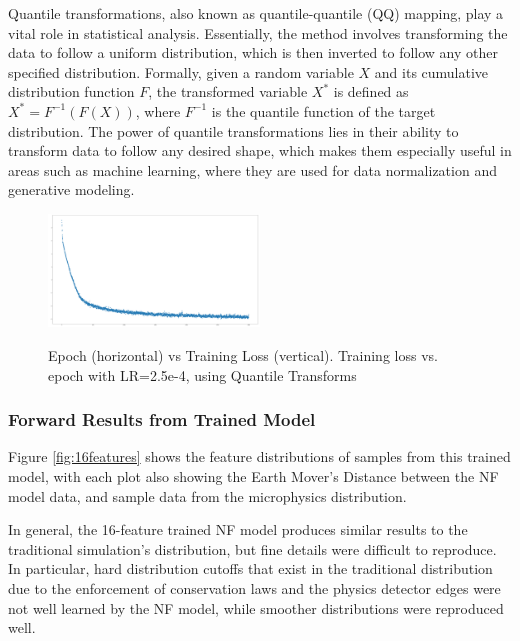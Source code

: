         
        Quantile transformations, also known as quantile-quantile (QQ) mapping, play a vital role in statistical analysis. Essentially, the method involves transforming the data to follow a uniform distribution, which is then inverted to follow any other specified distribution. Formally, given a random variable $X$ and its cumulative distribution function $F$, the transformed variable $X^*$ is defined as $X^* = F^{-1}(F(X))$, where $F^{-1}$ is the quantile function of the target distribution. The power of quantile transformations lies in their ability to transform data to follow any desired shape, which makes them especially useful in areas such as machine learning, where they are used for data normalization and generative modeling.

        \begin{figure}[H]
        \centering
        \includegraphics[width = 0.5\textwidth]{Chapters/Ch3-Simulations/normalizing_flows/pics/MeetingFigures/Bobby/LearningRate/learning_rate_25e-5_with_QT.png}
        \label{fig: jul8_pion_comparison4}
        \caption[Placeholder Short text]{Epoch (horizontal) vs Training Loss (vertical). Training loss vs. epoch with LR=2.5e-4, using Quantile Transforms }
        \end{figure}



    \subsubsection{Forward Results from Trained Model}
        Figure \ref{fig:16features} shows the feature distributions of samples from this trained model, with each plot also showing the Earth Mover's Distance between the NF model data, and sample data from the microphysics distribution.
    
        
        In general, the 16-feature trained NF model produces similar results to the traditional simulation's distribution, but fine details were difficult to reproduce. In particular, hard distribution cutoffs that exist in the traditional distribution due to the enforcement of conservation laws and the physics detector edges were not well learned by the NF model, while smoother distributions were reproduced well.
        
